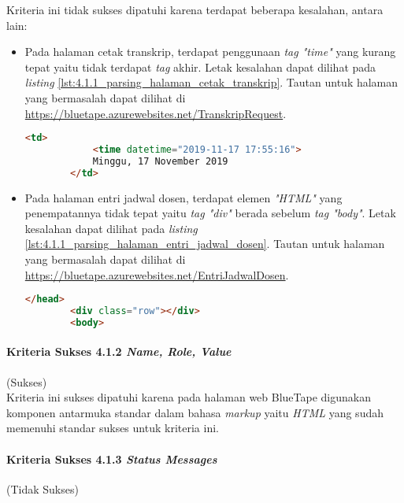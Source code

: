 Kriteria ini tidak sukses dipatuhi karena terdapat beberapa kesalahan, antara lain:

\begin{itemize}
    \item Pada halaman cetak transkrip, terdapat penggunaan \textit{tag "time"} yang kurang tepat yaitu tidak terdapat \textit{tag} akhir. Letak kesalahan dapat dilihat pada \textit{listing} \ref{lst:4.1.1_parsing_halaman_cetak_transkrip}. Tautan untuk halaman yang bermasalah dapat dilihat di \url{https://bluetape.azurewebsites.net/TranskripRequest}.
    \begin{lstlisting}[frame=single, label={lst:4.1.1_parsing_halaman_cetak_transkrip}, language=HTML, caption=Pelanggaran Kriteria Sukses 4.1.1 pada Halaman Cetak Transkrip]
        <td>
            <time datetime="2019-11-17 17:55:16">
            Minggu, 17 November 2019
        </td>
    \end{lstlisting}

    \item Pada halaman entri jadwal dosen, terdapat elemen \textit{"HTML"} yang penempatannya tidak tepat yaitu \textit{tag "div"} berada sebelum \textit{tag "body"}. Letak kesalahan dapat dilihat pada \textit{listing} \ref{lst:4.1.1_parsing_halaman_entri_jadwal_dosen}. Tautan untuk halaman yang bermasalah dapat dilihat di \url{https://bluetape.azurewebsites.net/EntriJadwalDosen}.
    \begin{lstlisting}[frame=single, label={lst:4.1.1_parsing_halaman_entri_jadwal_dosen}, language=HTML, caption=Pelanggaran Kriteria Sukses 4.1.1 pada Halaman Entri Jadwal Dosen]
        </head>
        <div class="row"></div>        
        <body>
    \end{lstlisting}
\end{itemize}

\paragraph{Kriteria Sukses 4.1.2 \textit{Name, Role, Value}}
\label{par:kepatuhan_bluetape_kriteria_sukses_4.1.2}
(Sukses)\\

Kriteria ini sukses dipatuhi karena pada halaman web BlueTape digunakan komponen antarmuka standar dalam bahasa \textit{markup} yaitu \textit{HTML} yang sudah memenuhi standar sukses untuk kriteria ini.

\paragraph{Kriteria Sukses 4.1.3 \textit{Status Messages}}
\label{par:kepatuhan_bluetape_kriteria_sukses_4.1.3}
(Tidak Sukses)\\

